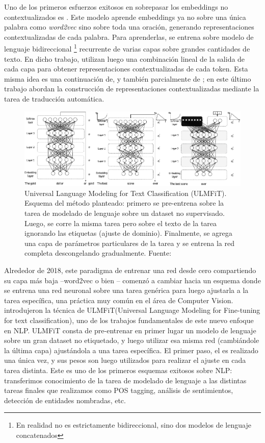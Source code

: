 Uno de los primeros esfuerzos exitosos en sobrepasar los embeddings no contextualizados es \elmo{} \cite{peters2018}. Este modelo aprende embeddings ya no sobre una única palabra como \emph{word2vec} sino sobre toda una oración, generando representaciones contextualizadas de cada palabra.  Para aprenderlas, \elmo{} se entrena sobre modelo de lenguaje bidireccional \footnote{En realidad no es estrictamente bidireccional, sino dos modelos de lenguaje concatenados} recurrente de varias capas sobre grandes cantidades de texto. En dicho trabajo, utilizan luego una combinación lineal de la salida de cada capa para obtener representaciones contextualizadas de cada token. Esta misma idea es una continuación de\citet{peters2017semi}, y también parcialmente de \citet{mccann2017learned}; en este último trabajo abordan la construcción de representaciones contextualizadas mediante la tarea de traducción automática.

\begin{figure}[t]
    \centering
    \includegraphics[width=\textwidth]{img/02/ulmfit.pdf}
    \caption{Universal Language Modeling for Text Classification (ULMFiT). Esquema del método planteado: primero se pre-entrena sobre la tarea de modelado de lenguaje sobre un dataset no supervisado. Luego, se corre la misma tarea pero sobre el texto de la tarea ignorando las etiquetas (ajuste de dominio). Finalmente, se agrega una capa de parámetros particulares de la tarea y se entrena la red completa descongelando gradualmente. Fuente: \citet{howard-ruder-2018-universal}}
    \label{fig:ulmfit}
\end{figure}

Alrededor de 2018, este paradigma de entrenar una red desde cero compartiendo su capa más baja --word2vec o bien \elmo{}-- comenzó a cambiar hacia un esquema donde se entrena una red neuronal sobre una tarea genérica para luego ajustarla a la tarea específica, una práctica muy común en el área de Computer Vision. \citet{howard-ruder-2018-universal} introdujeron la técnica de ULMFiT(Universal Language Modeling for Fine-tuning for text classification), uno de los trabajos fundamentales de este nuevo enfoque en NLP. ULMFiT consta de pre-entrenar en primer lugar un modelo de lenguaje sobre un gran dataset no etiquetado, y luego utilizar esa misma red (cambiándole la última capa) ajustándola a una tarea específica. El primer paso, el  es realizado una única vez, y sus pesos son luego utilizados para realizar el ajuste en cada tarea distinta. Este es uno de los primeros esquemas  exitosos sobre NLP: transferimos conocimiento de la tarea de modelado de lenguaje a las distintas tareas finales que realizamos como POS tagging, análisis de sentimientos, detección de entidades nombradas, etc.

